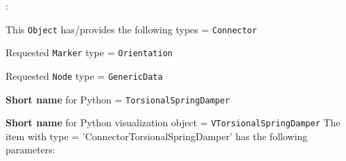 \noindent {}:
\bi
  \item This \texttt{Object} has/provides the following types = \texttt{Connector}
  \item Requested \texttt{Marker} type = \texttt{Orientation}
  \item Requested \texttt{Node} type = \texttt{GenericData}
  \item {\bf Short name} for Python = \texttt{TorsionalSpringDamper}
  \item {\bf Short name} for Python visualization object = \texttt{VTorsionalSpringDamper}
\ei\vspace{12pt} \noindent 
The item  with type = 'ConnectorTorsionalSpringDamper' has the following parameters:
\vspace{-0.5cm}\\
\vspace{-0.5cm}\\
